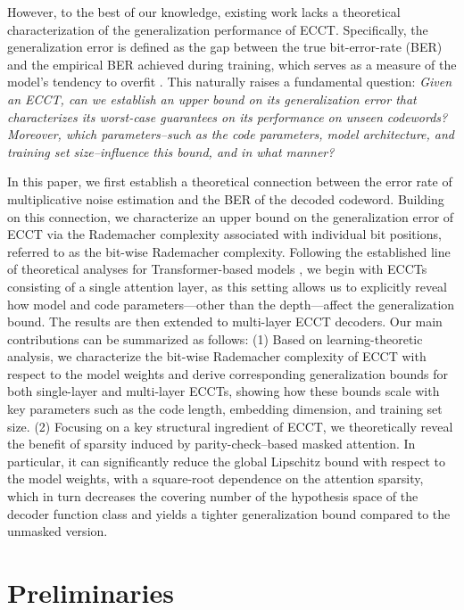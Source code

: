 \documentclass[lettersize,onecolumn]{IEEEtran}
\begin{document}
However, to the best of our knowledge, existing work lacks a theoretical characterization of the generalization performance of ECCT. Specifically, the generalization error is defined as the gap between the true bit-error-rate (BER) and the empirical BER achieved during training, which serves as a measure of the model’s tendency to overfit \cite{mohri2018foundationsofMachineLearningML}. This naturally raises a fundamental question: \emph{Given an ECCT, can we establish an upper bound on its generalization error that characterizes its worst-case guarantees on its performance on unseen codewords? Moreover, which parameters--such as the code parameters, model architecture, and training set size--influence this bound, and in what manner?}

In this paper, we first establish a theoretical connection between the error rate of multiplicative noise estimation and the BER of the decoded codeword. Building on this connection, we characterize an upper bound on the generalization error of ECCT via the Rademacher complexity associated with individual bit positions, referred to as the bit-wise Rademacher complexity. Following the established line of theoretical analyses for Transformer-based models \cite{edelman2022inductivebiasTransformerGeneralization,trauger2024sequence}, we begin with ECCTs consisting of a single attention layer, as this setting allows us to explicitly reveal how model and code parameters—other than the depth—affect the generalization bound. The results are then extended to multi-layer ECCT decoders. Our main contributions can be summarized as follows: (1) Based on learning-theoretic analysis, we characterize the bit-wise Rademacher complexity of ECCT with respect to the model weights and derive corresponding generalization bounds for both single-layer and multi-layer ECCTs, showing how these bounds scale with key parameters such as the code length, embedding dimension, and training set size. (2) Focusing on a key structural ingredient of ECCT, we theoretically reveal the benefit of sparsity induced by parity-check–based masked attention. In particular, it can significantly reduce the global Lipschitz bound with respect to the model weights, with a square-root dependence on the attention sparsity, which in turn decreases the covering number of the hypothesis space of the decoder function class and yields a tighter generalization bound compared to the unmasked version.

\section{Preliminaries}
\end{document}
